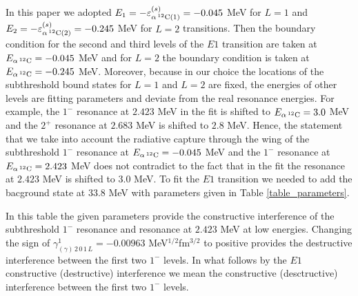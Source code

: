 \documentclass[prl,unsortedaddress,groupedaddress,twocolumn,amsmath,amsfonts,amssymb,showpacs,floatfix,nofootinbib]{revtex4}
\begin{document}
In this paper we adopted $E_{1}=-\varepsilon_{\alpha\,{}^{12}{\rm C}(1)}^{(s)}=-0.045$ MeV for $L=1$ and $E_{2}=-\varepsilon_{\alpha\,{}^{12}{\rm C}(2)}^{(s)}= -0.245$ MeV for $L=2$ transitions. 
Then the boundary condition for the second and third levels of the $E1$ transition are taken at $E_{\alpha\,{}^{12}{\rm C}}=-0.045$ MeV and for $L=2$ the boundary condition is taken at $E_{\alpha\,{}^{12}{\rm C}}= -0.245$ MeV. Moreover, because in our choice the locations of the subthreshold bound states for $L=1$ and $L=2$ are fixed, the energies of other levels are  fitting parameters and deviate from the real resonance energies. For example, the $1^{-}$ resonance at $2.423$ MeV in the fit is shifted to $E_{\alpha\,{}^{12}{\rm C}}= 3.0
$ MeV and the $2^{+}$ resonance at $2.683$ MeV is shifted to $2.8$ MeV. Hence, the statement that we take into account the radiative capture through the wing of the subthreshold $1^{-}$ resonance at $E_{\alpha\,{}^{12}{\rm C}}=-0.045$ MeV and the $1^{-}$ resonance at $E_{\alpha\,{}^{12}{\rm C}}= 2.423$ MeV does not contradict to the fact that in the fit the resonance at $2.423$ MeV is shifted to $3.0$ MeV. To fit the $E1$ transition we needed to add the bacground state at $33.8$ MeV with parameters given in Table \ref{table_parameters}. 

In this table the given parameters provide the constructive interference of the subthreshold $1^{-}$ resonance and resonance at $2.423$ MeV at low energies. Changing the sign of 
$\gamma_{(\gamma)\,2\,0\,1\,L}^{1}=-0.00963$ MeV${}^{1/2}$fm${}^{3/2}$ to positive  provides the destructive interference between the first two $1^{-}$ levels. In what follows by the $E1$ 
constructive (destructive) interference we mean the constructive (desctructive) interference between the first two $1^{-}$ levels.  
\end{document}
